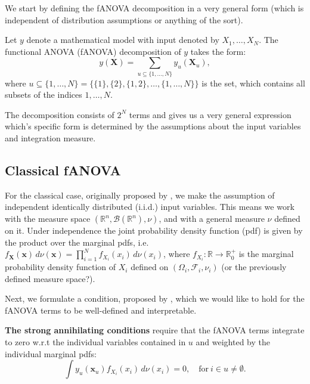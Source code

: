 We start by defining the fANOVA decomposition in a very general form (which is independent of distribution assumptions or anything of the sort).

\begin{definition}
Let $y$  denote a mathematical model with input denoted by $X_1, \dots, X_N$. The functional ANOVA (fANOVA) decomposition of $y$ takes the form:
\begin{equation}
    y(\boldsymbol{X}) = \sum_{u \subseteq \{1, \dots, N\}} y_{u}(\boldsymbol{X}_u),
    \label{eq:fanova_decomposition}
\end{equation}
where $u \subseteq \{1, \dots, N\} = \{ \{1\}, \{2\}, \{1, 2\}, \dots, \{1, \dots, N\} \}$ is the set, which contains all subsets of the indices $1, \dots, N$.
\end{definition}


The decomposition consists of $2^N$ terms and gives us a very general expression which's specific form is determined by the assumptions about the input variables and integration measure.

\subsection{Classical fANOVA}
For the classical case, originally proposed by \cite{sobol1993sensitivity}, we make the assumption of independent identically distributed (i.i.d.) input variables. This means we work with the measure space $(\mathbb{R}^n, \mathcal{B}(\mathbb{R}^n), \nu)$, and with a general measure $\nu$ defined on it.
Under independence the joint probability density function (pdf) is given by the product over the marginal pdfs, i.e. \(f_{\boldsymbol{X}}(\boldsymbol{x}) \, d\nu(\boldsymbol{x}) = \prod_{i=1}^{N} f_{X_i}(x_i) \, d\nu(x_i)\), where \(f_{X_i}: \mathbb{R} \rightarrow \mathbb{R}_{0}^{+}\) is the marginal probability density function of \(X_i\) defined on $(\Omega_i, \mathcal{F}_i, \nu_i)$ (or the previously defined measure space?).

Next, we formulate a condition, proposed by \cite{rahman2014}, which we would like to hold for the fANOVA terms to be well-defined and interpretable.\par
\textbf{The strong annihilating conditions} require that the fANOVA terms integrate to zero w.r.t the individual variables contained in $u$ and weighted by the individual marginal pdfs:
\begin{equation}
    \int y_u(\boldsymbol{x}_u) f_{X_i}(x_i) \, d\nu(x_i) = 0, \quad \text{for} \ i \in u \neq \emptyset.
    \label{eq:strong_annihilating_conditions}
\end{equation}

